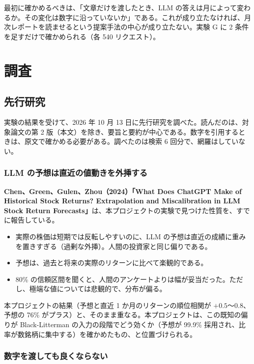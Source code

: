 \documentclass[xelatex,ja=standard,jafont=hiragino-pron,a4paper,10pt]{bxjsreport}
\begin{document}
最初に確かめるべきは、「文章だけを渡したとき、LLM の答えは月によって変わるか。その変化は数字に沿っていないか」である。これが成り立たなければ、月次レポートを読ませるという提案手法の中心が成り立たない。実験 G に 2 条件を足すだけで確かめられる（各 540 リクエスト）。

\part{調査}

\chapter{先行研究}\label{ch:literature}

実験の結果を受けて、2026 年 10 月 13 日に先行研究を調べた。読んだのは、対象論文の第 2 版（本文）を除き、要旨と要約が中心である。数字を引用するときは、原文で確かめる必要がある。調べたのは検索 6 回分で、網羅はしていない。

\section{LLM の予想は直近の値動きを外挿する}

\textbf{Chen、Green、Gulen、Zhou（2024）「What Does ChatGPT Make of Historical Stock Returns? Extrapolation and Miscalibration in LLM Stock Return Forecasts」}は、本プロジェクトの実験で見つけた性質を、すでに報告している。

\begin{itemize}
\item 実際の株価は短期では反転しやすいのに、LLM の予想は直近の成績に重みを置きすぎる（過剰な外挿）。人間の投資家と同じ偏りである。
\item 予想は、過去と将来の実際のリターンに比べて楽観的である。
\item 80\% の信頼区間を聞くと、人間のアンケートよりは幅が妥当だった。ただし、極端な値については悲観的で、分布が偏る。
\end{itemize}

本プロジェクトの結果（予想と直近 1 か月のリターンの順位相関が $+0.5$〜$0.8$、予想の 76\% がプラス）と、そのまま重なる。本プロジェクトは、この既知の偏りが Black-Litterman の入力の段階でどう効くか（予想が 99.9\% 採用され、比率が数銘柄に集中する）を確かめたもの、と位置づけられる。

\section{数字を渡しても良くならない}
\end{document}
